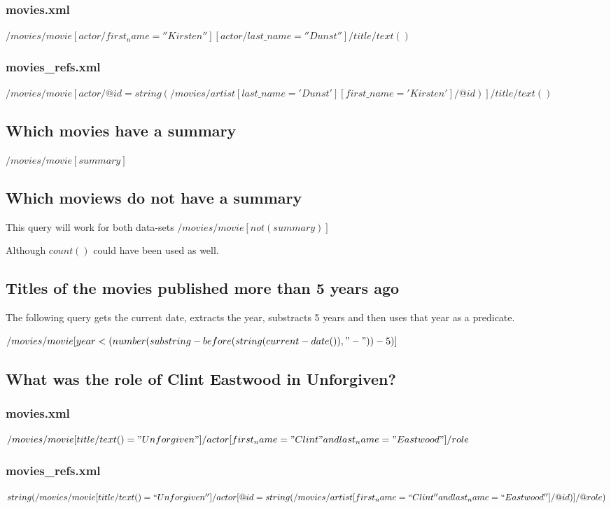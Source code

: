 \documentclass{article}
\begin{document}
\subsubsection{movies.xml}
$/movies/movie[actor/first_name=''Kirsten''][actor/last\_name=''Dunst'']/title/text()$
\subsubsection{movies\_refs.xml}
$/movies/movie[
        actor/@id = string(/movies/artist[
            last\_name='Dunst'
        ][
            first\_name='Kirsten'
        ]
        /@id)
    ]
    /title/text()$

\subsection{Which movies have a summary}
$/movies/movie[summary]$

\subsection{Which moviews do not have a summary}
This query will work for both data-sets
$/movies/movie[not(summary)]$

Although $count()$ could have been used as  well.
\subsection{Titles of the movies published more than 5 years ago}
The following query gets the current date, extracts the year,
substracts 5 years and then uses that year as a predicate.

$/movies/movie[
        year < (number(substring-before(string(current-date()), "-")) -5)
    ]
$

\subsection{What was the role of Clint Eastwood in Unforgiven?}
\subsubsection{movies.xml}
$/movies/movie[title/text() = "Unforgiven"]/actor[first_name = "Clint" and last_name = "Eastwood"]/role$
\subsubsection{movies\_refs.xml}
$string(/movies/movie[title/text() = ``Unforgiven'']/actor[
        @id = 
            string(/movies/artist[first_name= ``Clint'' and last_name = ``Eastwood'']/@id)
    ]/@role)
$
\end{document}
